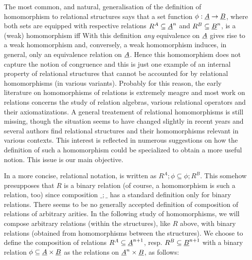 \documentclass[10pt]{article}
\begin{document}
The most common, and natural, generalisation of the definition of
homomorphism to relational structures says that a set function
$\phi:\underline {A}\rightarrow \underline {B}$, where both sets are equipped with
respective relations $R^A\subseteq \underline {A}^n$ and $R^B\subseteq
\underline {B}^n$, is a (weak) homomorphism 
iff 
With this definition {\em any} equivalence on $\underline {A}$ gives rise
to a weak homomorphism and, conversely, a weak homomorphism induces,
in general, only an equivalence relation on $\underline {A}$.  Hence this
homomorphism does not capture the notion of congruence and this is
just one example of an internal property of relational structures that
cannot be accounted for by relational homomorphisms (in various
variants).  Probably for this reason, the early literature on
homomorphisms of relations is extremely meagre \cite{Most,c:101} and
most work on relations concerns the study of relation algebras,
various relational operators and their axiomatizations.  A general
treatement of relational homomorphisms is still missing, though the
situation seems to have changed slightly in recent years and
several authors find relational structures and their homomorphisms
relevant in various contexts. This interest is reflected in numerous
suggestions on how the definition of such a homomorphism could be
specialized  to obtain a more useful notion.  This issue is
our main objective.

In a more concise, relational notation,  is written as
$R^A;\phi\subseteq \phi;R^B$. This somehow presupposes that $R$ is a
binary relation (of course, a homomorphism is such a relation,
too) since composition $\_;\_$ has a standard definition only for
binary relations.  There seems to be no generally accepted definition
of composition of relations of arbitrary arities. In the following
study of homomorphisms, we will compose arbitrary relations (within
the structures), like $R$ above, with binary relations (obtained from
homomorphisms between the structures).  We choose to define the
composition of relations $R^A\subseteq \underline {A}^{n+1}$, resp.
$R^B\subseteq \underline {B}^{n+1}$ with a binary relation $\phi\subseteq
\underline {A}\times\underline {B}$ as the relations on $\underline {A}^n\times\underline {B}$, as follows:
\end{document}
